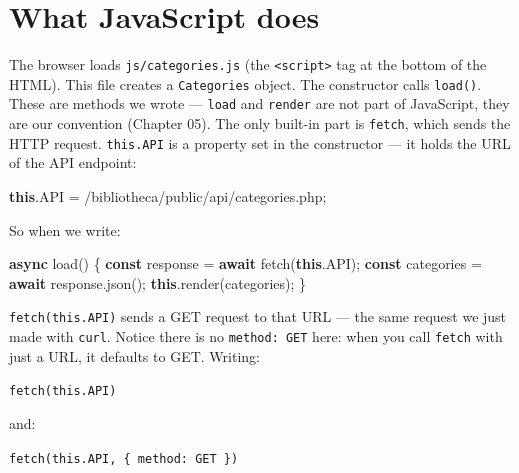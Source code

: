 \documentclass[11pt,a4paper,oneside]{book}
\newenvironment{Shaded}{\begin{snugshade}}{\end{snugshade}}
\newcommand{\KeywordTok}[1]{\textcolor[HTML]{007020}{\textbf{#1}}}
\newcommand{\StringTok}[1]{\textcolor[HTML]{4070A0}{#1}}
\newcommand{\FunctionTok}[1]{\textcolor[HTML]{06287E}{#1}}
\newcommand{\ControlFlowTok}[1]{\textcolor[HTML]{007020}{\textbf{#1}}}
\newcommand{\OperatorTok}[1]{\textcolor[HTML]{666666}{#1}}
\newcommand{\AttributeTok}[1]{\textcolor[HTML]{7D9029}{#1}}
\newcommand{\NormalTok}[1]{#1}
\begin{document}
\hypertarget{what-javascript-does}{%
\section{What JavaScript does}\label{what-javascript-does}}

The browser loads \texttt{js/categories.js} (the
\texttt{\textless{}script\textgreater{}} tag at the bottom of the
HTML). This file creates a \texttt{Categories} object. The
constructor calls \texttt{load()}. These are methods we wrote ---
\texttt{load} and \texttt{render} are not part of JavaScript,
they are our convention (Chapter 05). The only built-in part is
\texttt{fetch}, which sends the HTTP request. \texttt{this.API}
is a property set in the constructor --- it holds the URL of the
API endpoint:

\begin{Shaded}
\begin{Highlighting}[]
\KeywordTok{this}\OperatorTok{.}\AttributeTok{API} \OperatorTok{=} \StringTok{\textquotesingle{}/bibliotheca/public/api/categories.php\textquotesingle{}}\OperatorTok{;}
\end{Highlighting}
\end{Shaded}

So when we write:

\begin{Shaded}
\begin{Highlighting}[]
\KeywordTok{async} \FunctionTok{load}\NormalTok{() \{}
    \KeywordTok{const}\NormalTok{ response }\OperatorTok{=} \ControlFlowTok{await} \FunctionTok{fetch}\NormalTok{(}\KeywordTok{this}\OperatorTok{.}\AttributeTok{API}\NormalTok{)}\OperatorTok{;}
    \KeywordTok{const}\NormalTok{ categories }\OperatorTok{=} \ControlFlowTok{await}\NormalTok{ response}\OperatorTok{.}\FunctionTok{json}\NormalTok{()}\OperatorTok{;}
    \KeywordTok{this}\OperatorTok{.}\FunctionTok{render}\NormalTok{(categories)}\OperatorTok{;}
\NormalTok{\}}
\end{Highlighting}
\end{Shaded}

\texttt{fetch(this.API)} sends a GET request to that URL --- the
same request we just made with \texttt{curl}. Notice there is no
\texttt{method:\ \textquotesingle{}GET\textquotesingle{}} here:
when you call \texttt{fetch} with just a URL, it defaults to GET.
Writing:

\texttt{fetch(this.API)}

and:

\texttt{fetch(this.API,\ \{\ method:\ \textquotesingle{}GET\textquotesingle{}\ \})}
\end{document}
